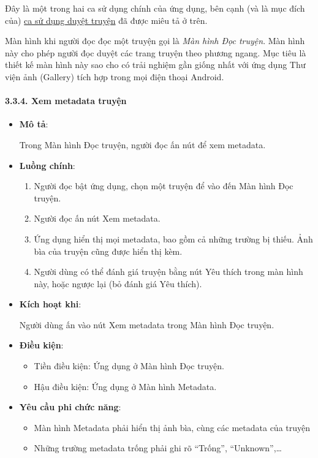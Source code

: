 \documentclass[
]{article}
\begin{document}
Đây là một trong hai ca sử dụng chính của ứng dụng, bên cạnh (và là mục
đích của) \protect\hyperlink{P3.3.2-browsing}{ca sử dụng duyệt truyện}
đã được miêu tả ở trên.

Màn hình khi người đọc đọc một truyện gọi là \emph{Màn hình Đọc truyện}.
Màn hình này cho phép người đọc duyệt các trang truyện theo phương
ngang. Mục tiêu là thiết kế màn hình này sao cho có trải nghiệm gần
giống nhất với ứng dụng Thư viện ảnh (Gallery) tích hợp trong mọi điện
thoại Android.

\hypertarget{xem-metadata-truyux1ec7n}{%
\paragraph{\texorpdfstring{3.3.4. Xem metadata truyện
}{3.3.4. Xem metadata truyện }}\label{xem-metadata-truyux1ec7n}}

\begin{itemize}
\item
  \textbf{Mô tả}:

  Trong Màn hình Đọc truyện, người đọc ấn nút để xem metadata.
\item
  \textbf{Luồng chính}:

  \begin{enumerate}
  \def\labelenumi{\arabic{enumi}.}
    \item
    Người đọc bật ứng dụng, chọn một truyện để vào đến Màn hình Đọc
    truyện.
  \item
    Người đọc ấn nút Xem metadata.
  \item
    Ứng dụng hiển thị mọi metadata, bao gồm cả những trường bị thiếu.
    Ảnh bìa của truyện cũng được hiển thị kèm.
  \item
    Người dùng có thể đánh giá truyện bằng nút Yêu thích trong màn hình
    này, hoặc ngược lại (bỏ đánh giá Yêu thích).
  \end{enumerate}
\item
  \textbf{Kích hoạt khi}:

  Người dùng ấn vào nút Xem metadata trong Màn hình Đọc truyện.
\item
  \textbf{Điều kiện}:

  \begin{itemize}
    \item
    Tiền điều kiện: Ứng dụng ở Màn hình Đọc truyện.
  \item
    Hậu điều kiện: Ứng dụng ở Màn hình Metadata.
  \end{itemize}
\item
  \textbf{Yêu cầu phi chức năng}:

  \begin{itemize}
    \item
    Màn hình Metadata phải hiển thị ảnh bìa, cùng các metadata của
    truyện
  \item
    Những trường metadata trống phải ghi rõ ``Trống'',
    ``Unknown'',\ldots{}
  \end{itemize}
\end{itemize}
\end{document}
